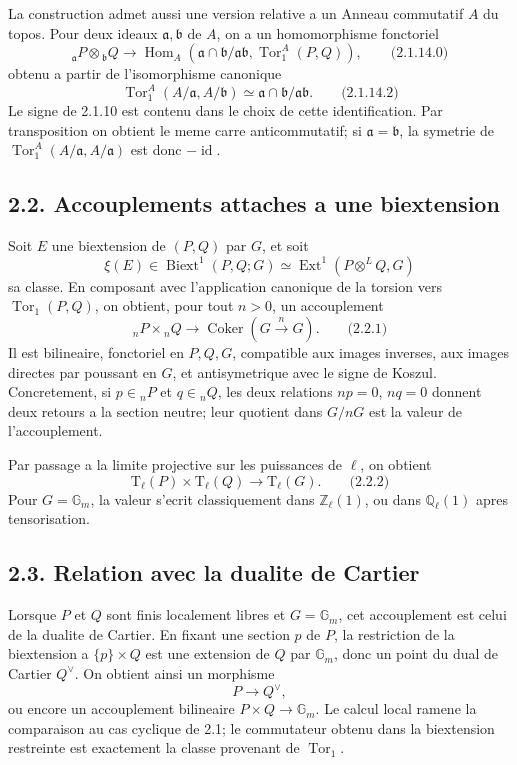 \documentclass[11pt]{article}
\providecommand{\Tor}{\operatorname{Tor}}
\providecommand{\Ql}{\mathbb Q_\ell}
\providecommand{\Zl}{\mathbb Z_\ell}
\providecommand{\Gm}{\mathbb G_m}
\providecommand{\Hom}{\operatorname{Hom}}
\providecommand{\Ext}{\operatorname{Ext}}
\providecommand{\id}{\operatorname{id}}
\providecommand{\Tate}{\mathrm T}
\providecommand{\Biext}{\operatorname{Biext}}
\providecommand{\Ext}{\operatorname{Ext}}
\providecommand{\Tor}{\operatorname{Tor}}
\providecommand{\Hom}{\operatorname{Hom}}
\providecommand{\Coker}{\operatorname{Coker}}
\providecommand{\Gm}{\mathbb G_m}
\providecommand{\Ql}{\mathbb Q_\ell}
\providecommand{\Zl}{\mathbb Z_\ell}
\providecommand{\id}{\mathrm{id}}
\begin{document}
La construction admet aussi une version relative a un Anneau commutatif \(A\) du topos.  Pour deux ideaux \(\mathfrak a,\mathfrak b\) de \(A\), on a un homomorphisme fonctoriel
\[
        {}_{\mathfrak a}P\otimes {}_{\mathfrak b}Q
        \longrightarrow
        \Hom_A(\mathfrak a\cap\mathfrak b/\mathfrak a\mathfrak b,\Tor_1^A(P,Q)),
\qquad\text{(2.1.14.0)}
\]
obtenu a partir de l'isomorphisme canonique
\[
        \Tor_1^A(A/\mathfrak a,A/\mathfrak b)
        \simeq \mathfrak a\cap\mathfrak b/\mathfrak a\mathfrak b.
\qquad\text{(2.1.14.2)}
\]
Le signe de 2.1.10 est contenu dans le choix de cette identification.  Par transposition on obtient le meme carre anticommutatif; si \(\mathfrak a=\mathfrak b\), la symetrie de \(\Tor_1^A(A/\mathfrak a,A/\mathfrak a)\) est donc \(-\id\).

\subsection*{2.2. Accouplements attaches a une biextension}

Soit \(E\) une biextension de \((P,Q)\) par \(G\), et soit
\[
        \xi(E)\in \Biext^1(P,Q;G)\simeq \Ext^1(P\otimes^L Q,G)
\]
sa classe.  En composant avec l'application canonique de la torsion vers \(\Tor_1(P,Q)\), on obtient, pour tout \(n>0\), un accouplement
\[
        {}_nP\times {}_nQ\longrightarrow \Coker(G\xrightarrow{n}G).
\qquad\text{(2.2.1)}
\]
Il est bilineaire, fonctoriel en \(P,Q,G\), compatible aux images inverses, aux images directes par poussant en \(G\), et antisymetrique avec le signe de Koszul.  Concretement, si \(p\in{}_nP\) et \(q\in{}_nQ\), les deux relations \(np=0\), \(nq=0\) donnent deux retours a la section neutre; leur quotient dans \(G/nG\) est la valeur de l'accouplement.

Par passage a la limite projective sur les puissances de \(\ell\), on obtient
\[
        \Tate_\ell(P)\times \Tate_\ell(Q)
        \longrightarrow \Tate_\ell(G).
\qquad\text{(2.2.2)}
\]
Pour \(G=\Gm\), la valeur s'ecrit classiquement dans \(\Zl(1)\), ou dans \(\Ql(1)\) apres tensorisation.

\subsection*{2.3. Relation avec la dualite de Cartier}

Lorsque \(P\) et \(Q\) sont finis localement libres et \(G=\Gm\), cet accouplement est celui de la dualite de Cartier.  En fixant une section \(p\) de \(P\), la restriction de la biextension a \(\{p\}\times Q\) est une extension de \(Q\) par \(\Gm\), donc un point du dual de Cartier \(Q^\vee\).  On obtient ainsi un morphisme
\[
        P\longrightarrow Q^\vee,
\]
ou encore un accouplement bilineaire \(P\times Q\to\Gm\).  Le calcul local ramene la comparaison au cas cyclique de 2.1; le commutateur obtenu dans la biextension restreinte est exactement la classe provenant de \(\Tor_1\).
\end{document}
